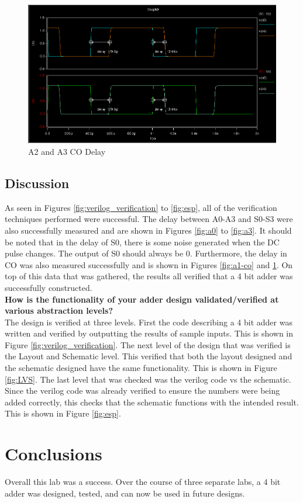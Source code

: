 \documentclass[12pt]{article}
\begin{document}
\begin{figure}[H]
\centering
\includegraphics[width=1\linewidth]{a2-co}
\caption{A2 and A3 CO Delay}
\label{fig:a2-co}
\end{figure}


\subsection{Discussion}
As seen in Figures \ref{fig:verilog_verification} to \ref{fig:esp}, all of the verification techniques performed were successful. The delay between A0-A3 and S0-S3 were also successfully measured and are shown in Figures \ref{fig:a0} to \ref{fig:a3}. It should be noted that in the delay of S0, there is some noise generated when the DC pulse changes. The output of S0 should always be 0. Furthermore, the delay in CO was also measured successfully and is shown in Figures \ref{fig:a1-co} and \ref{fig:a2-co}. On top of this data that was gathered, the results all verified that a 4 bit adder was successfully constructed.\\

\noindent\textbf{How is the functionality of your adder design validated/verified at various abstraction levels?}\\
\noindent The design is verified at three levels. First the code describing a 4 bit adder was written and verified by outputting the results of sample inputs. This is shown in Figure \ref{fig:verilog_verification}. The next level of the design that was verified is the Layout and Schematic level. This verified that both the layout designed and the schematic designed have the same functionality. This is shown in Figure \ref{fig:LVS}. The last level that was checked was the verilog code vs the schematic. Since the verilog code was already verified to ensure the numbers were being added correctly, this checks that the schematic functions with the intended result. This is shown in Figure \ref{fig:esp}.
\section{Conclusions}
Overall this lab was a success. Over the course of three separate labs, a 4 bit adder was designed, tested, and can now be used in future designs.
\end{document}
